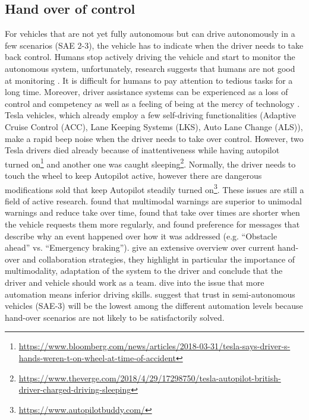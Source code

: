 \subsection{Hand over of control}
For vehicles that are not yet fully autonomous but can drive autonomously in a few scenarios (SAE 2-3), the vehicle has to indicate when the driver needs to take back control. Humans stop actively driving the vehicle and start to monitor the autonomous system, unfortunately, research suggests that humans are not good at monitoring \citep{Naujoks2014TheConditions.}. It is difficult for humans to pay attention to tedious tasks for a long time. Moreover, driver assistance systems can be experienced as a loss of control and competency as well as a feeling of being at the mercy of technology \citep{Eckoldt2012AnSystems}. Tesla vehicles, which already employ a few self-driving functionalities (Adaptive Cruise Control (ACC), Lane Keeping Systems (LKS), Auto Lane Change (ALS)), make a rapid beep noise when the driver needs to take over control. However, two Tesla drivers died already because of inattentiveness while having autopilot turned on\footnote{\url{https://www.bloomberg.com/news/articles/2018-03-31/tesla-says-driver-s-hands-weren-t-on-wheel-at-time-of-accident}} and another one was caught sleeping\footnote{\url{https://www.theverge.com/2018/4/29/17298750/tesla-autopilot-british-driver-charged-driving-sleeping}}. Normally, the driver needs to touch the wheel to keep Autopilot active, however there are dangerous modifications sold that keep Autopilot steadily turned on\footnote{\url{https://www.autopilotbuddy.com/}}. These issues are still a field of active research. \citet{Politis} found that multimodal warnings are superior to unimodal warnings and reduce take over time, \citet{Merat2014TransitionVehicle} found that take over times are shorter when the vehicle requests them more regularly, and \citet{Koo2015} found preference for messages that describe why an event happened over how it was addressed (e.g. “Obstacle ahead” vs. “Emergency braking”).  \citet{Walch2017} give an extensive overview over current hand-over and collaboration strategies, they highlight in particular the importance of multimodality, adaptation of the system to the driver and conclude that the driver and vehicle should work as a team. \citet{Meschtscherjakova} dive into the issue that more automation means inferior driving skills. \citet{Rodel} suggest that trust in semi-autonomous vehicles (SAE-3) will be the lowest among the different automation levels because hand-over scenarios are not likely to be satisfactorily solved. 



